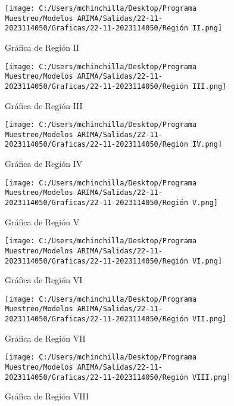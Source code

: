 \documentclass{article}%
\begin{document}
%


\begin{figure}[H]%
\centering%
\texttt{[image: C:/Users/mchinchilla/Desktop/Programa Muestreo/Modelos ARIMA/Salidas/22-11-2023114050/Graficas/22-11-2023114050/Región II.png]}%
\caption{Gráfica de Región II}%
\end{figure}

%


\begin{figure}[H]%
\centering%
\texttt{[image: C:/Users/mchinchilla/Desktop/Programa Muestreo/Modelos ARIMA/Salidas/22-11-2023114050/Graficas/22-11-2023114050/Región III.png]}%
\caption{Gráfica de Región III}%
\end{figure}

%


\begin{figure}[H]%
\centering%
\texttt{[image: C:/Users/mchinchilla/Desktop/Programa Muestreo/Modelos ARIMA/Salidas/22-11-2023114050/Graficas/22-11-2023114050/Región IV.png]}%
\caption{Gráfica de Región IV}%
\end{figure}

%


\begin{figure}[H]%
\centering%
\texttt{[image: C:/Users/mchinchilla/Desktop/Programa Muestreo/Modelos ARIMA/Salidas/22-11-2023114050/Graficas/22-11-2023114050/Región V.png]}%
\caption{Gráfica de Región V}%
\end{figure}

%


\begin{figure}[H]%
\centering%
\texttt{[image: C:/Users/mchinchilla/Desktop/Programa Muestreo/Modelos ARIMA/Salidas/22-11-2023114050/Graficas/22-11-2023114050/Región VI.png]}%
\caption{Gráfica de Región VI}%
\end{figure}

%


\begin{figure}[H]%
\centering%
\texttt{[image: C:/Users/mchinchilla/Desktop/Programa Muestreo/Modelos ARIMA/Salidas/22-11-2023114050/Graficas/22-11-2023114050/Región VII.png]}%
\caption{Gráfica de Región VII}%
\end{figure}

%


\begin{figure}[H]%
\centering%
\texttt{[image: C:/Users/mchinchilla/Desktop/Programa Muestreo/Modelos ARIMA/Salidas/22-11-2023114050/Graficas/22-11-2023114050/Región VIII.png]}%
\caption{Gráfica de Región VIII}%
\end{figure}
\end{document}
